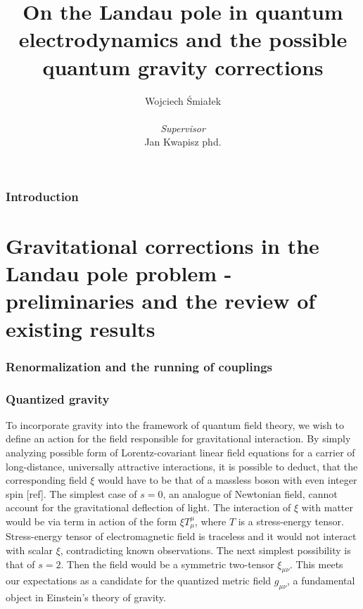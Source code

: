 \documentclass[11pt, a4paper]{article}
\title{\vspace{-2cm}On the Landau pole in quantum electrodynamics and the possible quantum gravity corrections}
\author{{Wojciech Śmiałek}\\
\\
{\textit{Supervisor}} \\
{Jan Kwapisz phd.}}
\date{}
\begin{document}
\maketitle

\section*{Introduction}

\part{Gravitational corrections in the Landau pole problem - preliminaries and the review of existing results}

\section{Renormalization and the running of couplings}

\section{Quantized gravity}

To incorporate gravity into the framework of quantum field theory, %
we wish to define an action for the field responsible for gravitational interaction.
By simply analyzing possible form of Lorentz-covariant linear field equations for a carrier of long-distance, 
universally attractive interactions, it is possible to deduct, that the corresponding field $\xi$ would have to be that of a massless boson with even integer spin [ref].
The simplest case of $s=0$, an analogue of Newtonian field, cannot account for the gravitational deflection of light.
The interaction of $\xi$ with matter would be via term in action of the form $\xi T^\mu_\mu$, where $T$ is a stress-energy tensor.
Stress-energy tensor of electromagnetic field is traceless and it would not interact with scalar $\xi$, contradicting known observations.
The next simplest possibility is that of $s=2$. Then the field would be a symmetric two-tensor $\xi_{\mu\nu}$. This meets our expectations as a
candidate for the quantized metric field $g_{\mu\nu}$, a fundamental object in Einstein's theory of gravity.
\end{document}
